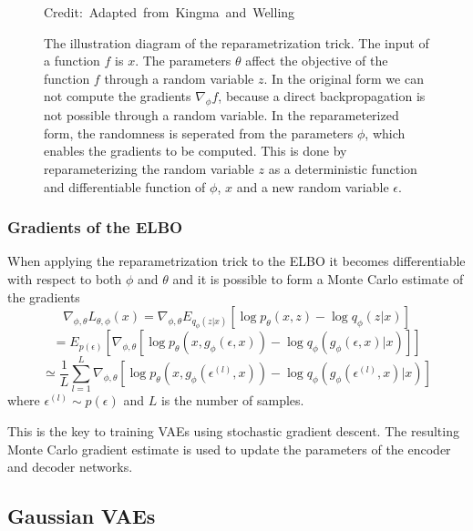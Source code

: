 \begin{figure}
    \centering
    
    \caption[The illustration diagram of the reparametrization trick]%
    {The illustration diagram of the reparametrization trick. The input of a function $f$ is $x$. The parameters $\theta$ affect the objective of the function $f$ through a random variable $z$. In the original form we can not compute the gradients $\nabla_{\phi} f$, because a direct backpropagation is not possible through a random variable. In the reparameterized form, the randomness is seperated from the parameters $\phi$, which enables the gradients to be computed. This is done by reparameterizing the random variable $z$ as a deterministic function and differentiable function  of $\phi$, $x$ and a new random variable $\epsilon$.\cite{Kingma_2019}}

    \hspace*{15pt}\hbox{\scriptsize Credit: Adapted from Kingma and Welling\cite{Kingma_2019}  }\label{reparametrization}

\end{figure}

\subsubsection{Gradients of the ELBO}

When applying the reparametrization trick to the ELBO it becomes differentiable with respect to both $\phi$ and $\theta$ and it is possible to form a Monte Carlo estimate of the gradients
\[ \nabla_{\phi, \theta} L_{\theta, \phi}(x) = \nabla_{\phi, \theta} E_{q_{\phi}(z|x)} [\log p_{\theta}(x, z) - \log q_{\phi}(z|x)] \]
\[ = E_{p(\epsilon)}[\nabla_{\phi, \theta} [\log p_{\theta}(x, g_{\phi}(\epsilon, x)) - \log q_{\phi}(g_{\phi}(\epsilon, x)|x)]] \]
\[  \simeq \frac{1}{L} \sum_{l=1}^{L} \nabla_{\phi, \theta} [\log p_{\theta}(x, g_{\phi}(\epsilon^{(l)}, x)) - \log q_{\phi}(g_{\phi}(\epsilon^{(l)}, x)|x)] \]
where $\epsilon^{(l)} \sim p(\epsilon)$ and $L$ is the number of samples.

This is the key to training VAEs using stochastic gradient descent. The resulting Monte Carlo gradient estimate is used to update the parameters of the encoder and decoder networks.\cite{Kingma_2019}


\subsection{Gaussian VAEs}

